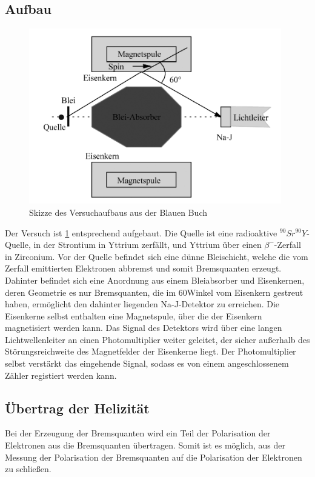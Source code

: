 \subsection{Aufbau}
\begin{figure}[H]
    \centering
    \includegraphics[width=110mm,scale=0.5]{Paritaetsverletzung/include/ParitaetsverletzungAufbau.png}
    \caption{Skizze des Versuchaufbaus aus der Blauen Buch \cite{BlueBook}} 
    \label{fig:Versuchsaufbau}
\end{figure}
Der Versuch ist \ref{fig:Versuchsaufbau} entsprechend aufgebaut. Die Quelle ist eine radioaktive $^{90}Sr^{90}Y$-Quelle, in der Strontium in Yttrium zerfällt, und Yttrium über einen $\beta^-$-Zerfall in Zirconium. Vor der Quelle befindet sich eine dünne Bleischicht, welche die vom Zerfall emittierten Elektronen abbremst und somit Bremsquanten erzeugt. Dahinter befindet sich eine Anordnung aus einem Bleiabsorber und Eisenkernen, deren Geometrie es nur Bremsquanten, die im 60\degree Winkel vom Eisenkern gestreut haben, ermöglicht den dahinter liegenden Na-J-Detektor zu erreichen. Die Eisenkerne selbst enthalten eine Magnetspule, über die der Eisenkern magnetisiert werden kann. Das Signal des Detektors wird über eine langen Lichtwellenleiter an einen Photomultiplier weiter geleitet, der sicher außerhalb des Störungsreichweite des Magnetfelder der Eisenkerne liegt. Der Photomultiplier selbst verstärkt das eingehende Signal, sodass es von einem angeschlossenem Zähler registiert werden kann. 
\subsection{Übertrag der Helizität}
Bei der Erzeugung der Bremsquanten wird ein Teil der Polarisation der Elektronen aus die Bremsquanten übertragen. Somit ist es möglich, aus der Messung der Polarisation der Bremsquanten auf die Polarisation der Elektronen zu schließen. 

